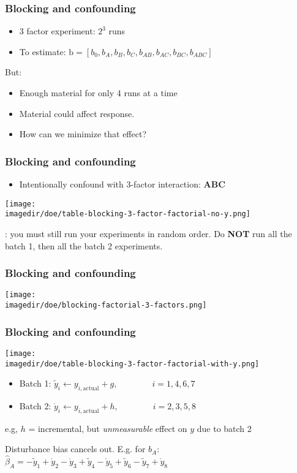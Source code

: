 \begin{frame}\frametitle{Blocking and confounding}
	\begin{itemize}
		\item	3 factor experiment: $2^3$ runs
		\item	To estimate: $\mathrm{b} = [b_0, b_A, b_B, b_C, b_{AB}, b_{AC}, b_{BC}, b_{ABC}]$
	\end{itemize}

	But:
	\begin{itemize}
		\item	Enough material for only 4 runs at a time
		\item	Material could affect response.
		\item	How can we minimize that effect?
	\end{itemize}
\end{frame}

\begin{frame}\frametitle{Blocking and confounding}
	\begin{itemize}
		\item	Intentionally confound with 3-factor interaction: \textbf{ABC}
	\end{itemize}
	\begin{center}
		\texttt{[image: \\imagedir/doe/table-blocking-3-factor-factorial-no-y.png]}
	\end{center}
	\vspace{12pt}
	{\color{myOrange}{Important note}}: you must still run your experiments in random order. Do \textbf{NOT} run all the batch 1, then all the batch 2 experiments.
\end{frame}

\begin{frame}\frametitle{Blocking and confounding}
	\begin{center}
		\texttt{[image: \\imagedir/doe/blocking-factorial-3-factors.png]}
	\end{center}
\end{frame}

\begin{frame}\frametitle{Blocking and confounding}
	\begin{center}
		\texttt{[image: \\imagedir/doe/table-blocking-3-factor-factorial-with-y.png]}
	\end{center}
	\begin{itemize}
		\item	Batch 1: $\widetilde{y}_i \leftarrow y_{i,\text{actual}} + g, \qquad\qquad i = 1, 4, 6, 7$
		\item	Batch 2: $\mathring{y}_i \leftarrow y_{i,\text{actual}} + h, \qquad\qquad i = 2, 3, 5, 8$
	\end{itemize}
	e.g, $h$ = incremental, but \emph{unmeasurable} effect on $y$ due to batch 2 
	
	\vspace{12pt}
	Disturbance bias cancels out. E.g. for $b_A$: $ \widehat{\beta}_A = -\widetilde{y}_1 + \mathring{y}_2 - \mathring{y}_3 + \widetilde{y}_4 - \mathring{y}_5 + \widetilde{y}_6 - \widetilde{y}_7 + \mathring{y}_8 $
\end{frame}

